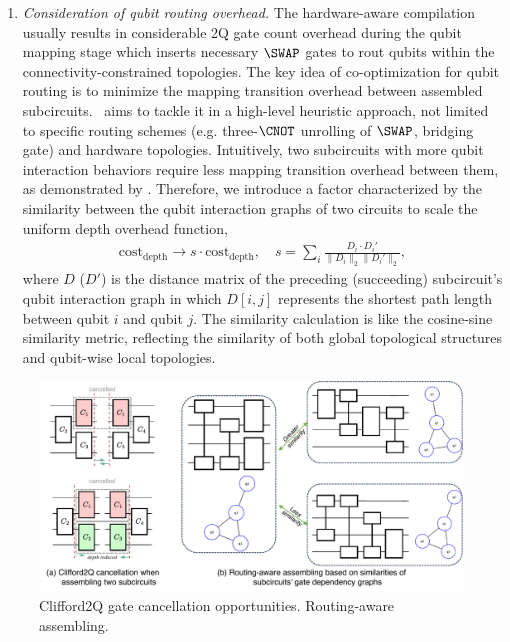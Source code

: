 \begin{enumerate}
    \item \emph{Consideration of qubit routing overhead.} The hardware-aware compilation usually results in considerable 2Q gate count overhead during the qubit mapping stage which inserts necessary $\SWAP$ gates to rout qubits within the connectivity-constrained topologies. The key idea of co-optimization for qubit routing is to minimize the mapping transition overhead between assembled subcircuits. \phoenix\ aims to tackle it in a high-level heuristic approach, not limited to specific routing schemes (e.g. three-$\CNOT$ unrolling of $\SWAP$, bridging gate) and hardware topologies. Intuitively, two subcircuits with more  qubit interaction behaviors require less mapping transition overhead between them, as demonstrated by . Therefore, we introduce a factor characterized by the similarity between the qubit interaction graphs of two circuits to scale the uniform depth overhead function,
    \begin{align}
        \mathrm{cost}_\mathrm{depth} \rightarrow s \cdot \mathrm{cost}_\mathrm{depth},\quad s = \sum_i \frac{D_i\cdot D_i'}{\lVert D_i \rVert_2 \lVert D_i' \rVert_2},
    \end{align}
    where $D$ ($D'$) is the distance matrix of the preceding (succeeding) subcircuit's qubit interaction graph in which $D[i,j]$ represents the shortest path length between qubit $i$ and qubit $j$. The similarity calculation is like the cosine-sine similarity metric, reflecting the similarity of both global topological structures and qubit-wise local topologies.
\end{enumerate}


\begin{figure}[tbp]
    \centering
    \includegraphics[width=\columnwidth]{figures/gate_cancel.pdf}
    \caption{Clifford2Q gate cancellation opportunities. Routing-aware assembling.}
    \label{fig:gate-cancel}
\end{figure}

